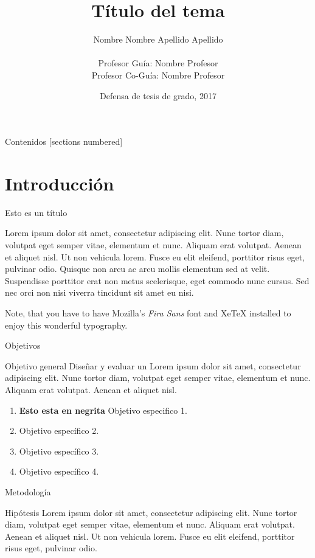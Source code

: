 \documentclass[10pt]{beamer}
\title{Título del tema}
\date{Defensa de tesis de grado, 2017}
\author{Nombre Nombre Apellido Apellido\inst{1} \\ \\ Profesor Guía: Nombre Profesor\\ Profesor Co-Guía: Nombre Profesor}
\institute
{
\inst{1}%
Departamento de Ingeniería Informática\\
Universidad de Santiago de Chile
}
\begin{document}
\maketitle

\begin{frame}{Contenidos}
  [sections numbered]
  \tableofcontents[hideallsubsections]
\end{frame}


\section{Introducción}

\begin{frame}[fragile]{Esto es un título}

Lorem ipsum dolor sit amet, consectetur adipiscing elit. Nunc tortor diam, volutpat eget semper vitae, elementum et nunc. Aliquam erat volutpat. Aenean et aliquet nisl. Ut non vehicula lorem. Fusce eu elit eleifend, porttitor risus eget, pulvinar odio. Quisque non arcu ac arcu mollis elementum sed at velit. Suspendisse porttitor erat non metus scelerisque, eget commodo nunc cursus. Sed nec orci non nisi viverra tincidunt sit amet eu nisi.

Note, that you have to have Mozilla's \emph{Fira Sans} font and XeTeX
installed to enjoy this wonderful typography.
\end{frame}

\begin{frame}[fragile]{Objetivos}
      \begin{block}{Objetivo general}
      Diseñar y evaluar un Lorem ipsum dolor sit amet, consectetur adipiscing elit. Nunc tortor diam, volutpat eget semper vitae, elementum et nunc. Aliquam erat volutpat. Aenean et aliquet nisl.
      \end{block}
      \begin{enumerate}
        \item \textbf{Esto esta en negrita} Objetivo especifico 1.
        \item Objetivo específico 2.
        \item Objetivo específico 3.
        \item Objetivo específico 4.
\end{enumerate}
\end{frame}

\begin{frame}[fragile]{Metodología}
      \begin{exampleblock}{Hipótesis}
      Lorem ipsum dolor sit amet, consectetur adipiscing elit. Nunc tortor diam, volutpat eget semper vitae, elementum et nunc. Aliquam erat volutpat. Aenean et aliquet nisl. Ut non vehicula lorem. Fusce eu elit eleifend, porttitor risus eget, pulvinar odio.
      \end{exampleblock}

\end{frame}
\end{document}
